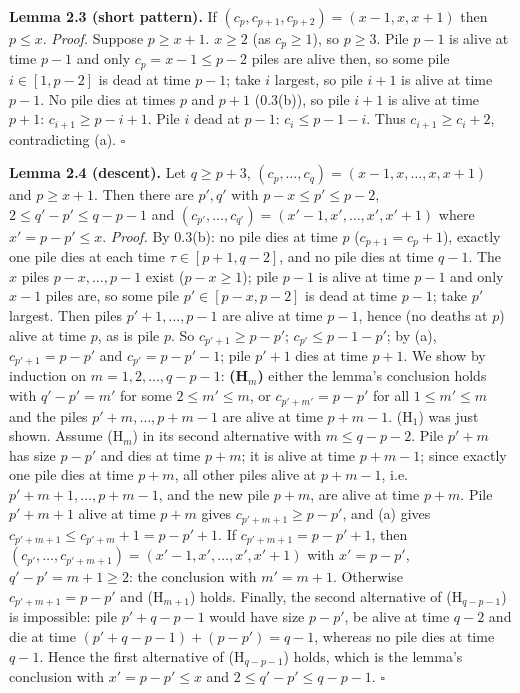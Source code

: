 \textbf{Lemma 2.3 (short pattern).} If
\((c_p,c_{p+1},c_{p+2})=(x-1,x,x+1)\) then \(p\le x\). \emph{Proof.}
Suppose \(p\ge x+1\). \(x\ge2\) (as \(c_p\ge1\)), so \(p\ge3\). Pile
\(p-1\) is alive at time \(p-1\) and only \(c_p=x-1\le p-2\) piles are
alive then, so some pile \(i\in[1,p-2]\) is dead at time \(p-1\); take
\(i\) largest, so pile \(i+1\) is alive at time \(p-1\). No pile dies at
times \(p\) and \(p+1\) (0.3(b)), so pile \(i+1\) is alive at time
\(p+1\): \(c_{i+1}\ge p-i+1\). Pile \(i\) dead at \(p-1\):
\(c_i\le p-1-i\). Thus \(c_{i+1}\ge c_i+2\), contradicting (a).
\(\square\)

\textbf{Lemma 2.4 (descent).} Let \(q\ge p+3\),
\((c_p,\dots,c_q)=(x-1,x,\dots,x,x+1)\) and \(p\ge x+1\). Then there are
\(p',q'\) with \(p-x\le p'\le p-2\), \(2\le q'-p'\le q-p-1\) and
\((c_{p'},\dots,c_{q'})=(x'-1,x',\dots,x',x'+1)\) where
\(x'=p-p'\le x\). \emph{Proof.} By 0.3(b): no pile dies at time \(p\)
(\(c_{p+1}=c_p+1\)), exactly one pile dies at each time
\(\tau\in[p+1,q-2]\), and no pile dies at time \(q-1\). The \(x\) piles
\(p-x,\dots,p-1\) exist (\(p-x\ge1\)); pile \(p-1\) is alive at time
\(p-1\) and only \(x-1\) piles are, so some pile \(p'\in[p-x,p-2]\) is
dead at time \(p-1\); take \(p'\) largest. Then piles \(p'+1,\dots,p-1\)
are alive at time \(p-1\), hence (no deaths at \(p\)) alive at time
\(p\), as is pile \(p\). So \(c_{p'+1}\ge p-p'\); \(c_{p'}\le p-1-p'\);
by (a), \(c_{p'+1}=p-p'\) and \(c_{p'}=p-p'-1\); pile \(p'+1\) dies at
time \(p+1\). We show by induction on \(m=1,2,\dots,q-p-1\):
\textbf{(H\(_m\))} either the lemma's conclusion holds with \(q'-p'=m'\)
for some \(2\le m'\le m\), or \(c_{p'+m'}=p-p'\) for all
\(1\le m'\le m\) and the piles \(p'+m,\dots,p+m-1\) are alive at time
\(p+m-1\). (H\(_1\)) was just shown. Assume (H\(_m\)) in its second
alternative with \(m\le q-p-2\). Pile \(p'+m\) has size \(p-p'\) and
dies at time \(p+m\); it is alive at time \(p+m-1\); since exactly one
pile dies at time \(p+m\), all other piles alive at \(p+m-1\),
i.e.~\(p'+m+1,\dots,p+m-1\), and the new pile \(p+m\), are alive at time
\(p+m\). Pile \(p'+m+1\) alive at time \(p+m\) gives
\(c_{p'+m+1}\ge p-p'\), and (a) gives
\(c_{p'+m+1}\le c_{p'+m}+1=p-p'+1\). If \(c_{p'+m+1}=p-p'+1\), then
\((c_{p'},\dots,c_{p'+m+1})=(x'-1,x',\dots,x',x'+1)\) with \(x'=p-p'\),
\(q'-p'=m+1\ge2\): the conclusion with \(m'=m+1\). Otherwise
\(c_{p'+m+1}=p-p'\) and (H\(_{m+1}\)) holds. Finally, the second
alternative of (H\(_{q-p-1}\)) is impossible: pile \(p'+q-p-1\) would
have size \(p-p'\), be alive at time \(q-2\) and die at time
\((p'+q-p-1)+(p-p')=q-1\), whereas no pile dies at time \(q-1\). Hence
the first alternative of (H\(_{q-p-1}\)) holds, which is the lemma's
conclusion with \(x'=p-p'\le x\) and \(2\le q'-p'\le q-p-1\).
\(\square\)

